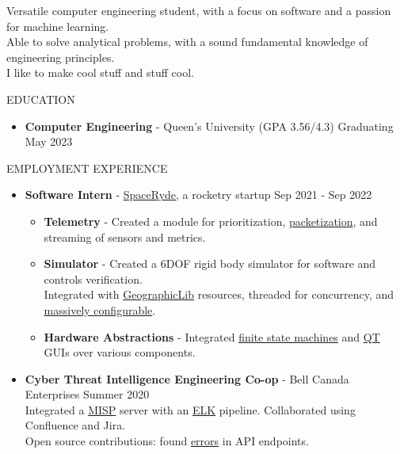 \documentclass{resume} %
\begin{document}
Versatile computer engineering student, with a focus on software and a passion for machine learning.\\
Able to solve analytical problems, with a sound fundamental knowledge of engineering principles.\\
I like to make cool stuff and stuff cool.

\begin{rSection}{EDUCATION}
\begin{itemize}
    \item {\bf Computer Engineering} - Queen's University (GPA 3.56/4.3) \hfill {Graduating May 2023}
\end{itemize}
\end{rSection}

\begin{rSection}{EMPLOYMENT EXPERIENCE}
\begin{itemize}
    \item {\bf Software Intern} - \href{https://youtu.be/-21FYbKWdd0}{SpaceRyde}, a rocketry startup \hfill {Sep 2021 - Sep 2022}
    \begin{itemize}
        \setlength\itemsep{-0.5em}
        \item[\textbullet] {\bf Telemetry} - Created a module for prioritization, \href{http://libtins.github.io/}{packetization}, and streaming of sensors and metrics.
        \item[\textbullet] {\bf Simulator} - Created a 6DOF rigid body simulator for software and controls verification.\\
        Integrated with \href{https://geographiclib.sourceforge.io/C++/doc/index.html}{GeographicLib} resources, threaded for concurrency, and \href{https://github.com/jbeder/yaml-cpp}{massively configurable}.
        \item[\textbullet] {\bf Hardware Abstractions} - Integrated \href{https://en.wikipedia.org/wiki/Finite-state_machine}{finite state machines} and \href{https://wiki.qt.io/Qt_for_Beginners}{QT} GUIs over various components. 
    \end{itemize}
    \item {\bf Cyber Threat Intelligence Engineering Co-op} - Bell Canada Enterprises \hfill {Summer 2020}\\
    Integrated a \href{https://www.misp-project.org/}{MISP} server with an \href{https://www.elastic.co/what-is/elk-stack}{ELK} pipeline. Collaborated using Confluence and Jira.\\
    Open source contributions: found \href{https://github.com/MISP/PyMISP/issues/588}{errors} in API endpoints.
\end{itemize}
\end{rSection}
\end{document}
